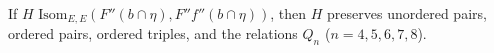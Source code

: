 If $H \text{ Isom}_{E,E}(F''(b \cap \eta), F''f''(b \cap \eta))$, then $H$ preserves unordered pairs, ordered pairs, ordered triples, and the relations $Q_n$ ($n=4,5,6,7,8$).
